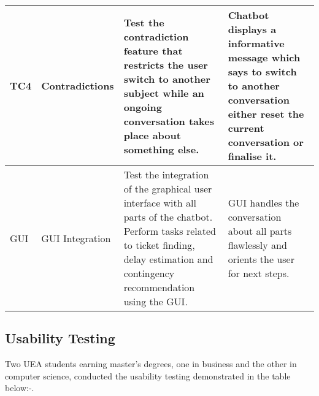 \begin{longtable}{|p{2cm}|p{4cm}|p{4cm}|p{4cm}|}
    TC4 & Contradictions & Test the contradiction feature that restricts the user switch to another subject while an ongoing conversation takes place about something else. & Chatbot displays a informative message which says to switch to another conversation either reset the current conversation or finalise it. \\
    \hline
    
    GUI & GUI Integration & Test the integration of the graphical user interface with all parts of the chatbot. Perform tasks related to ticket finding, delay estimation and contingency recommendation using the GUI. & GUI handles the conversation about all parts flawlessly and orients the user for next steps.  \\
    \hline
    \end{longtable}
    
\subsection{Usability Testing}
Two UEA students earning master's degrees, one in business and the other in computer science, conducted the usability testing demonstrated in the table below:-. 


